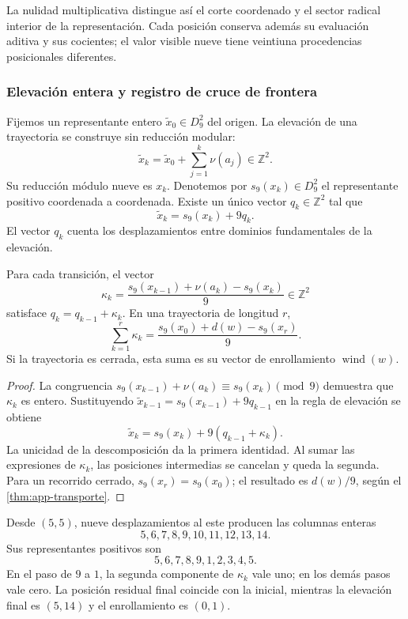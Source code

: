 La nulidad multiplicativa distingue así el corte coordenado y el sector radical interior de la representación. Cada posición conserva además su evaluación aditiva y sus cocientes; el valor visible nueve tiene veintiuna procedencias posicionales diferentes.

\subsubsection{Elevación entera y registro de cruce de frontera}

Fijemos un representante entero $\widetilde x_0\in D_9^2$ del origen. La elevación de una trayectoria se construye sin reducción modular:
\[
 \widetilde x_k=\widetilde x_0+\sum_{j=1}^{k}\nu(a_j)
 \in\mathbb Z^2.
\]
Su reducción módulo nueve es $x_k$. Denotemos por $s_9(x_k)\in D_9^2$ el representante positivo coordenada a coordenada. Existe un único vector $q_k\in\mathbb Z^2$ tal que
\[
 \widetilde x_k=s_9(x_k)+9q_k.
\]
El vector $q_k$ cuenta los desplazamientos entre dominios fundamentales de la elevación.

\begin{proposicion}
\label{geo:prop-cruces}
Para cada transición, el vector
\[
 \kappa_k=
 \frac{s_9(x_{k-1})+\nu(a_k)-s_9(x_k)}9
 \in\mathbb Z^2
\]
satisface $q_k=q_{k-1}+\kappa_k$. En una trayectoria de longitud $r$,
\[
 \sum_{k=1}^{r}\kappa_k
 =\frac{s_9(x_0)+d(w)-s_9(x_r)}9.
\]
Si la trayectoria es cerrada, esta suma es su vector de enrollamiento $\operatorname{wind}(w)$.
\end{proposicion}

\begin{proof}
La congruencia $s_9(x_{k-1})+\nu(a_k)\equiv s_9(x_k)\pmod9$ demuestra que $\kappa_k$ es entero. Sustituyendo $\widetilde x_{k-1}=s_9(x_{k-1})+9q_{k-1}$ en la regla de elevación se obtiene
\[
 \widetilde x_k=s_9(x_k)+9(q_{k-1}+\kappa_k).
\]
La unicidad de la descomposición da la primera identidad. Al sumar las expresiones de $\kappa_k$, las posiciones intermedias se cancelan y queda la segunda. Para un recorrido cerrado, $s_9(x_r)=s_9(x_0)$; el resultado es $d(w)/9$, según el \cref{thm:app-transporte}.
\end{proof}

\begin{ejemplo}
Desde $(5,5)$, nueve desplazamientos al este producen las columnas enteras
\[
 5,6,7,8,9,10,11,12,13,14.
\]
Sus representantes positivos son
\[
 5,6,7,8,9,1,2,3,4,5.
\]
En el paso de $9$ a $1$, la segunda componente de $\kappa_k$ vale uno; en los demás pasos vale cero. La posición residual final coincide con la inicial, mientras la elevación final es $(5,14)$ y el enrollamiento es $(0,1)$.
\end{ejemplo}

